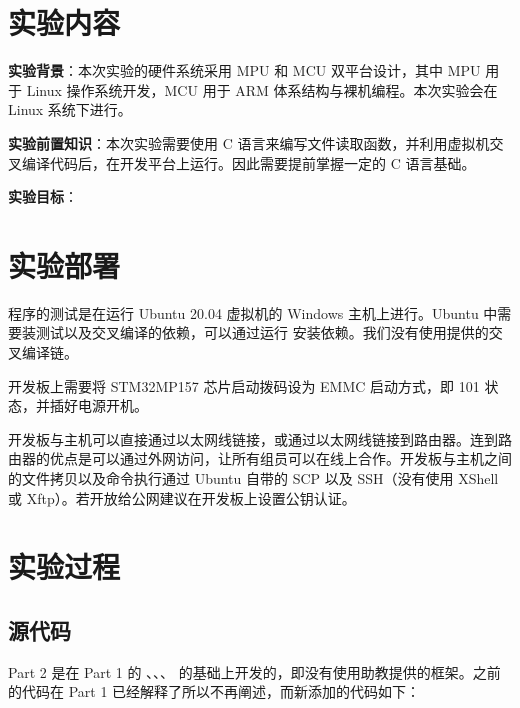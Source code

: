 
\section{实验内容}

\textbf{实验背景}：本次实验的硬件系统采用 MPU 和 MCU 双平台设计，其中 MPU 用于 Linux 操作系统开发，MCU 用于 ARM 体系结构与裸机编程。本次实验会在 Linux 系统下进行。

\textbf{实验前置知识}：本次实验需要使用 C 语言来编写文件读取函数，并利用虚拟机交叉编译代码后，在开发平台上运行。因此需要提前掌握一定的 C 语言基础。

\textbf{实验目标}：



\section{实验部署}

程序的测试是在运行 Ubuntu 20.04 虚拟机的 Windows 主机上进行。Ubuntu 中需要装测试以及交叉编译的依赖，可以通过运行  安装依赖。我们没有使用提供的交叉编译链。

开发板上需要将 STM32MP157 芯片启动拨码设为 EMMC 启动方式，即 101 状态，并插好电源开机。

开发板与主机可以直接通过以太网线链接，或通过以太网线链接到路由器。连到路由器的优点是可以通过外网访问，让所有组员可以在线上合作。开发板与主机之间的文件拷贝以及命令执行通过 Ubuntu 自带的 SCP 以及 SSH（没有使用 XShell 或 Xftp）。若开放给公网建议在开发板上设置公钥认证。

\section{实验过程}

\subsection{源代码}


Part 2 是在 Part 1 的 、、、 的基础上开发的，即没有使用助教提供的框架。之前的代码在 Part 1 已经解释了所以不再阐述，而新添加的代码如下：


